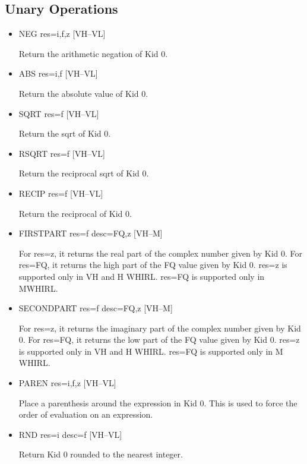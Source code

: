 \subsection{Unary Operations}
\begin{itemize}

\item
{}%
NEG res=i,f,z \hfill [VH--VL]

Return the arithmetic negation of Kid 0.

%
\item  ABS res=i,f \hfill [VH--VL]

Return the absolute value of Kid 0.

\item
{}%
SQRT res=f \hfill [VH--VL]

Return the sqrt of Kid 0.

\item
{}%
RSQRT res=f \hfill [VH--VL]

Return the reciprocal sqrt of Kid 0.

\item
{}%
RECIP res=f \hfill [VH--VL]

Return the reciprocal of Kid 0.

\item
{}%
FIRSTPART res=f desc=FQ,z \hfill [VH--M]

For res=z, it returns the real part of the complex number given by
Kid 0. For res=FQ, it returns the high part of the FQ value given
by Kid 0. res=z
is supported only in VH and H WHIRL. res=FQ is supported only in
MWHIRL.

%
\item  SECONDPART res=f desc=FQ,z \hfill [VH--M]

For res=z, it returns the imaginary part of the complex number
given by Kid 0. For res=FQ, it returns the low part of the FQ value
given by Kid 0.  res=z is supported only in VH and H WHIRL. res=FQ is supported
only in M WHIRL.

\item
{}%
PAREN res=i,f,z \hfill [VH--VL]

Place a parenthesis around the expression in Kid 0. This is used
to force the order of evaluation on an expression.

\item
{}%
RND res=i desc=f \hfill [VH--VL]

Return Kid 0 rounded to the nearest integer.


\end{itemize}
